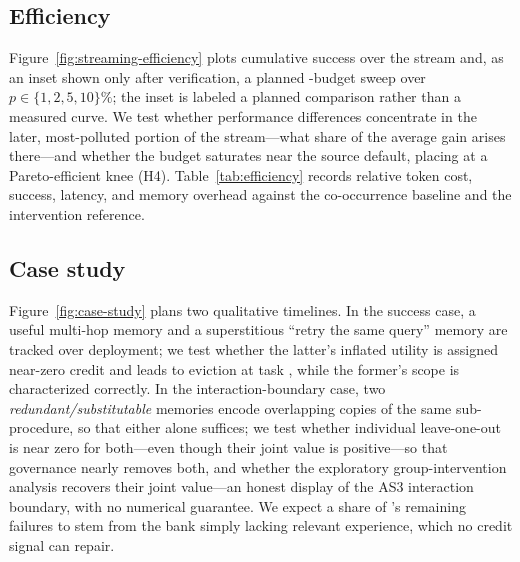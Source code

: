 \subsection{Efficiency}
Figure~\ref{fig:streaming-efficiency} plots cumulative success over the stream and,
as an inset shown only after verification, a planned \rit{}-budget sweep over
$p \in \{1, 2, 5, 10\}\%$; the inset is labeled a planned comparison rather than a
measured curve. We test whether performance differences concentrate in the later,
most-polluted portion of the stream---what share 
of the average gain arises there---and whether the \rit{} budget saturates near the
source default, placing \method{} at a Pareto-efficient knee (H4).
Table~\ref{tab:efficiency} records relative token cost, success, latency, and
memory overhead against the co-occurrence baseline and the intervention reference.




\subsection{Case study}
Figure~\ref{fig:case-study} plans two qualitative timelines. In the success case, a
useful multi-hop memory and a superstitious ``retry the same query'' memory are
tracked over deployment; we test whether the latter's inflated utility is assigned
near-zero \rit{} credit and leads to eviction at task
, while the former's scope is
characterized correctly. In the interaction-boundary case, two
\emph{redundant/substitutable} memories encode overlapping copies of the same
sub-procedure, so that either alone suffices; we test whether individual
leave-one-out is near zero for both---even though their joint value is
positive---so that governance nearly removes both, and whether the exploratory
group-intervention analysis recovers their joint value---an honest display of the
AS3 interaction boundary, with no numerical guarantee. We expect a
share  of \method{}'s remaining
failures to stem from the bank simply lacking relevant experience, which no credit
signal can repair.


